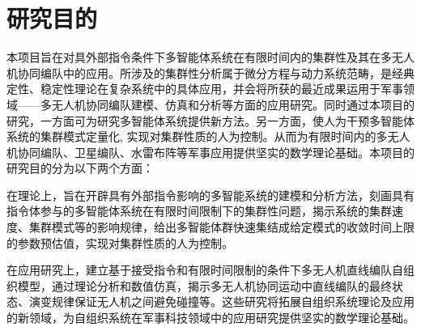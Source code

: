 
\section{研究目的}

本项目旨在对具外部指令条件下多智能体系统在有限时间内的集群性及其在多无人机协同编队中的应用。所涉及的集群性分析属于微分方程与动力系统范畴，是经典定性、稳定性理论在复杂系统中的具体应用，并会将所获的最近成果运用于军事领域——多无人机协同编队建模、仿真和分析等方面的应用研究。同时通过本项目的研究，一方面可为研究多智能体系统提供新方法。另一方面，使人为干预多智能体系统的集群模式定量化, 实现对集群性质的人为控制。从而为有限时间内的多无人机协同编队、卫星编队、水雷布阵等军事应用提供坚实的数学理论基础。本项目的研究目的分为以下两个方面：

在理论上，旨在开辟具有外部指令影响的多智能系统的建模和分析方法，刻画具有指令体参与的多智能体系统在有限时间限制下的集群性问题，揭示系统的集群速度、集群模式等的影响规律，给出多智能体群快速集结成给定模式的收敛时间上限的参数预估值，实现对集群性质的人为控制。

在应用研究上，建立基于接受指令和有限时间限制的条件下多无人机直线编队自组织模型，通过理论分析和数值仿真，揭示多无人机协同运动中直线编队的最终状态、演变规律保证无人机之间避免碰撞等。这些研究将拓展自组织系统理论及应用的新领域，为自组织系统在军事科技领域中的应用研究提供坚实的数学理论基础。
